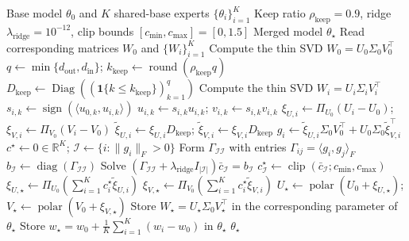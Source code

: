 \documentclass[11pt, a4paper]{utda}
\theoremstyle{plain}
\theoremstyle{definition}
\theoremstyle{remark}
\begin{document}
\begin{algorithm}[H]
\caption{ISO-Merger}
\label{alg:iso_merger}
\begin{algorithmic}[1]
\Require Base model $\theta_0$ and $K$ shared-base experts
         $\{\theta_i\}_{i=1}^K$
\Require Keep ratio $\rho_{\mathrm{keep}}=0.9$,
         ridge $\lambda_{\mathrm{ridge}}=10^{-12}$,
         clip bounds $[c_{\min},c_{\max}]=[0,1.5]$
\Ensure Merged model $\theta_\star$
    \State Read corresponding matrices $W_0$ and $\{W_i\}_{i=1}^K$
    \State Compute the thin SVD $W_0=U_0\Sigma_0V_0^\top$
    \State $q\gets\min\{d_{\mathrm{out}},d_{\mathrm{in}}\}$;
           $k_{\mathrm{keep}}\gets
             \operatorname{round}(\rho_{\mathrm{keep}}q)$
    \State $D_{\mathrm{keep}}\gets
           \operatorname{Diag}
             ((\mathbf1\{k\leq k_{\mathrm{keep}}\})_{k=1}^q)$
        \State Compute the thin SVD $W_i=U_i\Sigma_iV_i^\top$
            \State $s_{i,k}\gets\operatorname{sign}
                   (\langle u_{0,k},u_{i,k}\rangle)$
            \State $u_{i,k}\gets s_{i,k}u_{i,k}$;
                   $v_{i,k}\gets s_{i,k}v_{i,k}$
        \EndFor
        \State $\xi_{U,i}\gets\Pi_{U_0}(U_i-U_0)$;
               $\xi_{V,i}\gets\Pi_{V_0}(V_i-V_0)$
        \State $\widetilde\xi_{U,i}\gets\xi_{U,i}D_{\mathrm{keep}}$;
               $\widetilde\xi_{V,i}\gets\xi_{V,i}D_{\mathrm{keep}}$
        \State $g_i\gets
               \widetilde\xi_{U,i}\Sigma_0V_0^\top
               +U_0\Sigma_0\widetilde\xi_{V,i}^\top$
    \EndFor
    \State $c^\star\gets0\in\mathbb R^K$;
           $\mathcal I\gets\{i:\|g_i\|_F>0\}$
        \State Form $\Gamma_{\mathcal I\mathcal I}$ with entries
               $\Gamma_{ij}=\langle g_i,g_j\rangle_F$
        \State $b_{\mathcal I}\gets
               \operatorname{diag}(\Gamma_{\mathcal I\mathcal I})$
        \State Solve $(\Gamma_{\mathcal I\mathcal I}
               +\lambda_{\mathrm{ridge}}I_{|\mathcal I|})
               \bar c_{\mathcal I}=b_{\mathcal I}$
        \State $c_{\mathcal I}^\star\gets
               \operatorname{clip}
                 (\bar c_{\mathcal I};c_{\min},c_{\max})$
    \EndIf
    \State $\xi_{U,\star}\gets
           \Pi_{U_0}(\sum_{i=1}^K c_i^\star\widetilde\xi_{U,i})$
    \State $\xi_{V,\star}\gets
           \Pi_{V_0}(\sum_{i=1}^K c_i^\star\widetilde\xi_{V,i})$
    \State $U_\star\gets\operatorname{polar}(U_0+\xi_{U,\star})$;
           $V_\star\gets\operatorname{polar}(V_0+\xi_{V,\star})$
    \State Store $W_\star=U_\star\Sigma_0V_\star^\top$
           in the corresponding parameter of $\theta_\star$
\EndFor
{}
    \State Store $w_\star=w_0+\tfrac1K\sum_{i=1}^K(w_i-w_0)$
           in $\theta_\star$
\EndFor
\State \Return $\theta_\star$
\end{algorithmic}
\end{algorithm}
\end{document}
